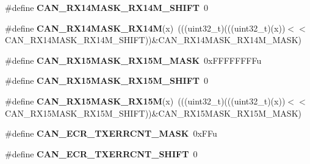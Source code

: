 \begin{DoxyCompactItemize}
\item 
\#define {\bfseries C\+A\+N\+\_\+\+R\+X14\+M\+A\+S\+K\+\_\+\+R\+X14\+M\+\_\+\+S\+H\+I\+FT}~0\hypertarget{group__CAN__Register__Masks_ga9e74b131e8180656fe9eb73191b73869}{}\label{group__CAN__Register__Masks_ga9e74b131e8180656fe9eb73191b73869}

\item 
\#define {\bfseries C\+A\+N\+\_\+\+R\+X14\+M\+A\+S\+K\+\_\+\+R\+X14M}(x)~(((uint32\+\_\+t)(((uint32\+\_\+t)(x))$<$$<$C\+A\+N\+\_\+\+R\+X14\+M\+A\+S\+K\+\_\+\+R\+X14\+M\+\_\+\+S\+H\+I\+FT))\&C\+A\+N\+\_\+\+R\+X14\+M\+A\+S\+K\+\_\+\+R\+X14\+M\+\_\+\+M\+A\+SK)\hypertarget{group__CAN__Register__Masks_ga23bf60adcf45d8330ade3f9cb43578a6}{}\label{group__CAN__Register__Masks_ga23bf60adcf45d8330ade3f9cb43578a6}

\item 
\#define {\bfseries C\+A\+N\+\_\+\+R\+X15\+M\+A\+S\+K\+\_\+\+R\+X15\+M\+\_\+\+M\+A\+SK}~0x\+F\+F\+F\+F\+F\+F\+F\+Fu\hypertarget{group__CAN__Register__Masks_gaf81f33076f662d5f4c737076e36e93b7}{}\label{group__CAN__Register__Masks_gaf81f33076f662d5f4c737076e36e93b7}

\item 
\#define {\bfseries C\+A\+N\+\_\+\+R\+X15\+M\+A\+S\+K\+\_\+\+R\+X15\+M\+\_\+\+S\+H\+I\+FT}~0\hypertarget{group__CAN__Register__Masks_ga1420efdd894578fe2a31563c25b58e59}{}\label{group__CAN__Register__Masks_ga1420efdd894578fe2a31563c25b58e59}

\item 
\#define {\bfseries C\+A\+N\+\_\+\+R\+X15\+M\+A\+S\+K\+\_\+\+R\+X15M}(x)~(((uint32\+\_\+t)(((uint32\+\_\+t)(x))$<$$<$C\+A\+N\+\_\+\+R\+X15\+M\+A\+S\+K\+\_\+\+R\+X15\+M\+\_\+\+S\+H\+I\+FT))\&C\+A\+N\+\_\+\+R\+X15\+M\+A\+S\+K\+\_\+\+R\+X15\+M\+\_\+\+M\+A\+SK)\hypertarget{group__CAN__Register__Masks_ga38935337048fdd5cb3b222d00047f4fe}{}\label{group__CAN__Register__Masks_ga38935337048fdd5cb3b222d00047f4fe}

\item 
\#define {\bfseries C\+A\+N\+\_\+\+E\+C\+R\+\_\+\+T\+X\+E\+R\+R\+C\+N\+T\+\_\+\+M\+A\+SK}~0x\+F\+Fu\hypertarget{group__CAN__Register__Masks_gae4da1b026e86291036b8b7d7e78bffa7}{}\label{group__CAN__Register__Masks_gae4da1b026e86291036b8b7d7e78bffa7}

\item 
\#define {\bfseries C\+A\+N\+\_\+\+E\+C\+R\+\_\+\+T\+X\+E\+R\+R\+C\+N\+T\+\_\+\+S\+H\+I\+FT}~0\hypertarget{group__CAN__Register__Masks_ga4f1e9e374563ef6c0502d1a441caf396}{}\label{group__CAN__Register__Masks_ga4f1e9e374563ef6c0502d1a441caf396}


\end{DoxyCompactItemize}
